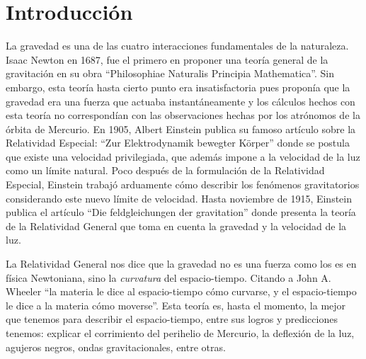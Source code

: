 \documentclass[11pt, letterpaper, spanish]{book}
\theoremstyle{definition}
\theoremstyle{plain}
\theoremstyle{remark}
\theoremstyle{break}
\begin{document}
\printnomenclature
\tableofcontents{}




\chapter*{Introducci\'{o}n}

La gravedad es una de las cuatro interacciones fundamentales de la naturaleza. Isaac Newton en 1687, fue el primero en proponer una teor\'{i}a general de la gravitaci\'{o}n en su obra ``Philosophiae Naturalis Principia Mathematica''. Sin embargo, esta teor\'{i}a hasta cierto punto era insatisfactoria pues propon\'{i}a que la gravedad era una fuerza que actuaba instant\'{a}neamente y los c\'{a}lculos hechos con esta teor\'{i}a no correspond\'{i}an con las observaciones hechas por los atr\'{o}nomos de la \'{o}rbita de Mercurio. En 1905, Albert Einstein publica su famoso art\'{i}culo sobre la Relatividad Especial: ``Zur Elektrodynamik bewegter K\"{o}rper'' donde se postula que existe una velocidad privilegiada, que adem\'{a}s impone a la velocidad de la luz como un l\'{i}mite natural. Poco despu\'{e}s de la formulaci\'{o}n de la Relatividad Especial, Einstein trabaj\'{o} arduamente c\'{o}mo describir los fen\'{o}menos gravitatorios considerando este nuevo l\'{i}mite de velocidad. Hasta noviembre de 1915, Einstein publica el art\'{i}culo  ``Die feldgleichungen der gravitation'' \cite{Einstein} donde presenta la teor\'{i}a de la Relatividad General que toma en cuenta la gravedad y la velocidad de la luz.

La Relatividad General nos dice que la gravedad no es una fuerza como los es en f\'{i}sica Newtoniana, sino la \emph{curvatura} del espacio-tiempo. Citando a John A. Wheeler ``la materia le dice al espacio-tiempo c\'{o}mo curvarse, y el espacio-tiempo le dice a la materia c\'{o}mo moverse''. Esta teor\'{i}a es, hasta el momento, la mejor que tenemos para describir el espacio-tiempo, entre sus logros y predicciones tenemos: explicar el corrimiento del perihelio de Mercurio, la deflexi\'{o}n de la luz, agujeros negros, ondas gravitacionales, entre otras.
\end{document}
